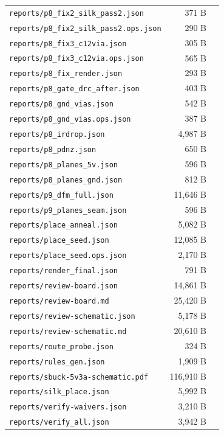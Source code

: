 \documentclass[11pt,a4paper]{article}
\begin{document}
{\begin{longtable}{p{9cm}rp{4cm}}
\texttt{reports/p8\_fix2\_silk\_pass2.json} & 371 B &  \\
\texttt{reports/p8\_fix2\_silk\_pass2.ops.json} & 290 B &  \\
\texttt{reports/p8\_fix3\_c12via.json} & 305 B &  \\
\texttt{reports/p8\_fix3\_c12via.ops.json} & 565 B &  \\
\texttt{reports/p8\_fix\_render.json} & 293 B &  \\
\texttt{reports/p8\_gate\_drc\_after.json} & 403 B &  \\
\texttt{reports/p8\_gnd\_vias.json} & 542 B &  \\
\texttt{reports/p8\_gnd\_vias.ops.json} & 387 B &  \\
\texttt{reports/p8\_irdrop.json} & 4,987 B &  \\
\texttt{reports/p8\_pdnz.json} & 650 B &  \\
\texttt{reports/p8\_planes\_5v.json} & 596 B &  \\
\texttt{reports/p8\_planes\_gnd.json} & 812 B &  \\
\texttt{reports/p9\_dfm\_full.json} & 11,646 B &  \\
\texttt{reports/p9\_planes\_seam.json} & 596 B &  \\
\texttt{reports/place\_anneal.json} & 5,082 B &  \\
\texttt{reports/place\_seed.json} & 12,085 B &  \\
\texttt{reports/place\_seed.ops.json} & 2,170 B &  \\
\texttt{reports/render\_final.json} & 791 B &  \\
\texttt{reports/review-board.json} & 14,861 B &  \\
\texttt{reports/review-board.md} & 25,420 B &  \\
\texttt{reports/review-schematic.json} & 5,178 B &  \\
\texttt{reports/review-schematic.md} & 20,610 B &  \\
\texttt{reports/route\_probe.json} & 324 B &  \\
\texttt{reports/rules\_gen.json} & 1,909 B &  \\
\texttt{reports/sbuck-5v3a-schematic.pdf} & 116,910 B &  \\
\texttt{reports/silk\_place.json} & 5,992 B &  \\
\texttt{reports/verify-waivers.json} & 3,210 B &  \\
\texttt{reports/verify\_all.json} & 3,942 B &  \\
\bottomrule
\end{longtable}
}
\end{document}
